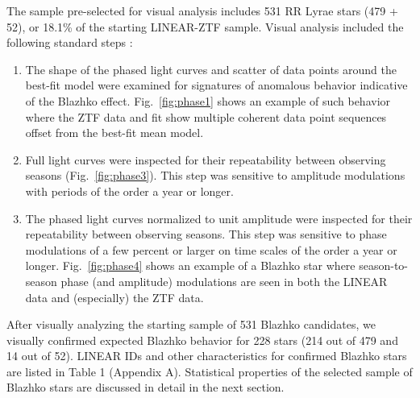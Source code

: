 The sample pre-selected for visual analysis includes 531 RR Lyrae stars (479 + 52),
or 18.1\% of the starting LINEAR-ZTF sample. Visual analysis included the following standard steps
\citep[e.g.,][]{2009MNRAS.400.1006J, 2017MNRAS.466.2602P}: 
\begin{enumerate}
\item The shape of the phased light curves and scatter of data points around the best-fit model were examined
    for signatures of anomalous behavior indicative of the Blazhko effect. 
    Fig.~\ref{fig:phase1} shows an example of such behavior where the ZTF data and fit show multiple coherent data point sequences
    offset from the best-fit mean model. 
  \item Full light curves were inspected for their repeatability between observing seasons (Fig.~\ref{fig:phase3}).
       This step was sensitive to amplitude modulations with periods of the order a year or longer.  
     \item The phased light curves normalized to unit amplitude were inspected for their repeatability between observing seasons.
       This step was sensitive to phase modulations of a few percent or larger on time scales of the order a year or longer.  
       Fig.~\ref{fig:phase4} shows an example of a Blazhko star where season-to-season phase (and amplitude) modulations
       are seen in both the LINEAR data and (especially) the ZTF data. 
\end{enumerate}

After visually analyzing the starting sample of 531 Blazhko candidates, we visually confirmed expected Blazhko
behavior for 228 stars (214 out of 479 and 14 out of 52). LINEAR IDs and other characteristics for confirmed
Blazhko stars are listed in Table 1 (Appendix A). Statistical properties of the selected sample of Blazhko stars are
discussed in detail in the next section. 

